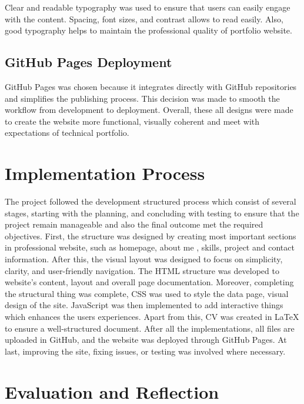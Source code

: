 \documentclass[12pt,a4paper]{article}
\begin{document}
Clear and readable typography was used to ensure that users can easily engage with the content. Spacing, font sizes, and contrast allows to read easily. Also, good typography helps to maintain the professional quality of portfolio website.

\subsection{GitHub Pages Deployment}

GitHub Pages was chosen because it integrates directly with GitHub repositories and simplifies the publishing process. This decision was made to smooth the workflow from development to deployment. 
Overall, these all designs were made to create the website more functional, visually coherent and meet with expectations of technical portfolio.

\section{Implementation Process}

The project followed the development structured process which consist of several stages, starting with the planning, and concluding with testing to ensure that the project remain manageable and also the final outcome met the required objectives. 
First, the structure was designed by creating most important sections in professional website, such as homepage, about me , skills, project and contact information. After this, the visual layout was designed to focus on simplicity, clarity, and user-friendly navigation. The HTML structure was developed to website's content, layout and overall page documentation. Moreover, completing the structural thing was complete, CSS was used to style the data page, visual design of the site. JavaScript was then implemented to add interactive things which enhances the users experiences. Apart from this, CV was created in LaTeX to ensure a well-structured document. After all the implementations, all files are uploaded in GitHub, and the website was deployed through GitHub Pages. At last, improving the site, fixing issues, or testing was involved where necessary.  


\section{Evaluation and Reflection}
\end{document}
